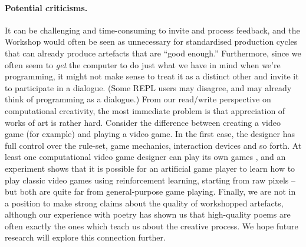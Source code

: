\paragraph{Potential criticisms.}
It can be challenging and time-consuming to invite and process feedback, and the Workshop would
often be seen as unnecessary for standardised production cycles that can already produce artefacts that are ``good enough.''
Furthermore, since we often seem to \emph{get} the computer to do just what we have in mind when we're programming,
it might not make sense to treat it as a distinct other and invite it to participate in a dialogue.
(Some REPL users may disagree, and may already think of programming as a dialogue.)
%
%
From our read/write perspective on computational creativity, the most immediate problem is that appreciation of
works of art is rather hard.  Consider the difference between creating a
video game (for example) and playing a video game.  In the first case,
the designer has full control over the rule-set, game mechanics,
interaction devices and so forth.  At least one
computational video game designer can play its own games \cite{cook2013mechanic},
and an experiment shows that it is possible for an artificial game player
to learn how to play classic video games using reinforcement learning, starting
from raw pixels \cite{deepmind-atari} -- but both are quite far from
general-purpose game playing.
%
Finally, we are not in a position to make strong claims about the quality of workshopped artefacts,
although our experience with poetry has shown us that high-quality poems are often exactly
the ones which teach us about the creative process.
We hope future research will explore this connection further.

